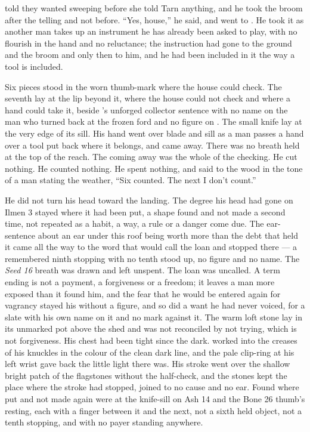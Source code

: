 \scenebreak

 told  they wanted sweeping before she told Tarn anything, and he took the broom after the telling and not before. “Yes, house,” he said, and went to . He took it as another man takes up an instrument he has already been asked to play, with no flourish in the hand and no reluctance; the instruction had gone to the ground and the broom and only then to him, and he had been included in it the way a tool is included.

Six pieces stood in the worn thumb-mark where the house could check. The seventh lay at the lip beyond it, where the house could not check and where a hand could take it, beside 's unforged collector sentence with no name on the man who turned back at the frozen ford and no figure on . The small knife lay at the very edge of its sill. His hand went over blade and sill as a man passes a hand over a tool put back where it belongs, and came away. There was no breath held at the top of the reach. The coming away was the whole of the checking. He cut nothing. He counted nothing. He spent nothing, and said to the wood in the tone of a man stating the weather, “Six counted. The next I don't count.”

He did not turn his head toward the landing. The degree his head had gone on Ilmen 3 stayed where it had been put, a shape found and not made a second time, not repeated as a habit, a way, a rule or a danger come due. The ear-sentence about an ear under this roof being worth more than the debt that held it came all the way to the word that would call the loan and stopped there --- a remembered ninth stopping with no tenth stood up, no figure and no name. The \emph{Seed 16} breath was drawn and left unspent. The loan was uncalled. A term ending is not a payment, a forgiveness or a freedom; it leaves a man more exposed than it found him, and the fear that he would be entered again for vagrancy stayed his without a figure, and so did a want he had never voiced, for a slate with his own name on it and no mark against it. The warm loft stone lay in its unmarked pot above the shed and was not reconciled by not trying, which is not forgiveness. His chest had been tight since the dark.  worked into the creases of his knuckles in the colour of the clean dark line, and the pale clip-ring at his left wrist gave back the little light there was. His stroke went over the shallow bright patch of the flagstones without the half-check, and the stones kept the place where the stroke had stopped, joined to no cause and no ear. Found where put and not made again were  at the knife-sill on Ash 14 and the Bone 26 thumb's resting, each with a finger between it and the next, not a sixth held object, not a tenth stopping, and with no payer standing anywhere.

